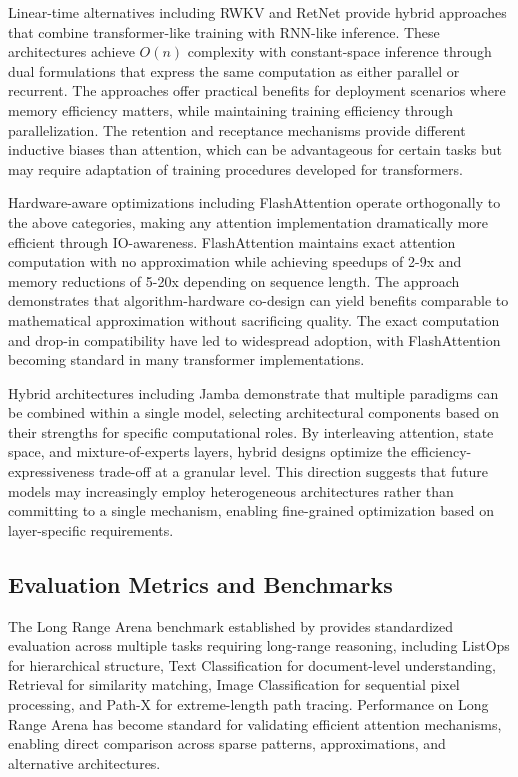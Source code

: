 Linear-time alternatives including RWKV and RetNet provide hybrid approaches that combine transformer-like training with RNN-like inference. These architectures achieve $O(n)$ complexity with constant-space inference through dual formulations that express the same computation as either parallel or recurrent. The approaches offer practical benefits for deployment scenarios where memory efficiency matters, while maintaining training efficiency through parallelization. The retention and receptance mechanisms provide different inductive biases than attention, which can be advantageous for certain tasks but may require adaptation of training procedures developed for transformers.

Hardware-aware optimizations including FlashAttention operate orthogonally to the above categories, making any attention implementation dramatically more efficient through IO-awareness. FlashAttention maintains exact attention computation with no approximation while achieving speedups of 2-9x and memory reductions of 5-20x depending on sequence length. The approach demonstrates that algorithm-hardware co-design can yield benefits comparable to mathematical approximation without sacrificing quality. The exact computation and drop-in compatibility have led to widespread adoption, with FlashAttention becoming standard in many transformer implementations.

Hybrid architectures including Jamba demonstrate that multiple paradigms can be combined within a single model, selecting architectural components based on their strengths for specific computational roles. By interleaving attention, state space, and mixture-of-experts layers, hybrid designs optimize the efficiency-expressiveness trade-off at a granular level. This direction suggests that future models may increasingly employ heterogeneous architectures rather than committing to a single mechanism, enabling fine-grained optimization based on layer-specific requirements.

\subsection{Evaluation Metrics and Benchmarks}

The Long Range Arena benchmark established by \citet{tay2021long} provides standardized evaluation across multiple tasks requiring long-range reasoning, including ListOps for hierarchical structure, Text Classification for document-level understanding, Retrieval for similarity matching, Image Classification for sequential pixel processing, and Path-X for extreme-length path tracing. Performance on Long Range Arena has become standard for validating efficient attention mechanisms, enabling direct comparison across sparse patterns, approximations, and alternative architectures.

